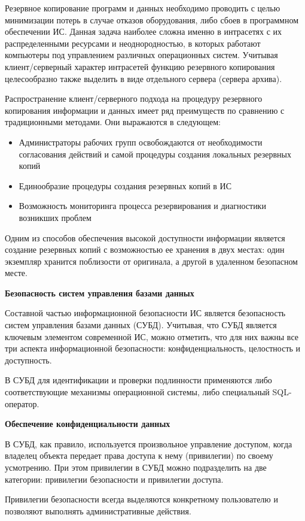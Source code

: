 Резервное копирование программ и данных необходимо проводить с целью минимизации потерь в случае отказов
оборудования, либо сбоев в программном обеспечении ИС. Данная задача наиболее сложна именно в интрасетях
с их распределенными ресурсами и неоднородностью, в которых работают компьютеры под управлением различных
операционных систем. Учитывая клиент/серверный характер интрасетей функцию резервного копирования целесообразно
также выделить в виде отдельного сервера (сервера архива).

Распространение клиент/серверного подхода на процедуру резервного копирования информации и данных
имеет ряд преимуществ по сравнению с традиционными методами. Они выражаются в следующем:
\begin{itemize}
    \item Администраторы рабочих групп освобождаются от необходимости согласования действий
    и самой процедуры создания локальных резервных копий
    \item Единообразие процедуры создания резервных копий в ИС
    \item Возможность мониторинга процесса резервирования и диагностики возникших проблем
\end{itemize}

Одним из способов обеспечения высокой доступности информации является создание резервных копий с возможностью
ее хранения в двух местах: один экземпляр хранится поблизости от оригинала, а другой в удаленном безопасном месте.

\bigbreak
\textbf{Безопасность систем управления базами данных}

Составной частью информационной безопасности ИС является безопасность систем управления
базами данных (СУБД). Учитывая, что СУБД является ключевым элементом современной ИС, можно отметить, что
для них важны все три аспекта информационной безопасности: конфиденциальность, целостность и доступность.

В СУБД для идентификации и проверки подлинности применяются либо соответствующие механизмы операционной
системы, либо специальный SQL-оператор.

\bigbreak
\textbf{Обеспечение конфиденциальности данных}

В СУБД, как правило, используется произвольное управление доступом, когда владелец объекта передает
права доступа к нему (привилегии) по своему усмотрению. При этом привилегии в СУБД можно подразделить на две
категории: привилегии безопасности и привилегии доступа.

Привилегии безопасности всегда выделяются конкретному пользователю и позволяют выполнять административные действия.

